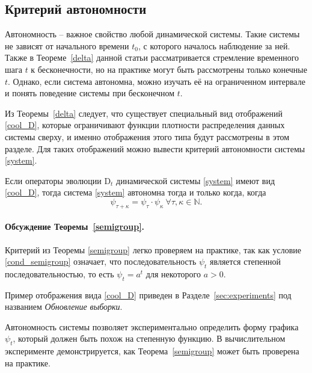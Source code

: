     \subsection{Критерий автономности}
    
        Автономность -- важное свойство любой динамической системы. Такие системы не зависят от начального времени $t_0$, с которого началось наблюдение за ней. Также в Теореме~\ref{delta} данной статьи рассматривается стремление временного шага $t$ к бесконечности, но на практике могут быть рассмотрены только конечные $t$. Однако, если система автономна, можно изучать её на ограниченном интервале и понять поведение системы при бесконечном $t$.
    
        Из Теоремы~\ref{delta} следует, что существует специальный вид отображений \eqref{cool_D}, которые ограничивают функции плотности распределения данных системы сверху, и именно отображения этого типа будут рассмотрены в этом разделе. Для таких отображений можно вывести критерий автономности системы \eqref{system}.
    
        \begin{theorem}[Веприков, 2023] \label{semigroup}
            Если операторы эволюции $\text{D}_t$ динамической системы \eqref{system} имеют вид \eqref{cool_D}, тогда система \eqref{system} автономна тогда и только когда, когда
            \begin{equation} \label{cond_semigroup}
                \psi_{\tau + \kappa} = \psi_{\tau} \cdot \psi_{\kappa} ~\forall \tau, \kappa \in \mathbb{N}.
            \end{equation}
        \end{theorem}
    
        \paragraph{Обсуждение Теоремы~\ref{semigroup}.} Критерий из Теоремы \ref{semigroup} легко проверяем на практике, так как условие \eqref{cond_semigroup} означает, что последовательность $\psi_t$ является степенной последовательностью, то есть $\psi_t = a^t$ для некоторого $a > 0$. 
    
        Пример отображения вида \eqref{cool_D} приведен в Разделе~\ref{sec:experiments} под названием \emph{Обновление выборки}.
    
        Автономность системы позволяет экспериментально определить форму графика $\psi_t$, который должен быть похож на степенную функцию. В вычислительном эксперименте демонстрируется, как Теорема~\ref{semigroup} может быть проверена на практике.
    
